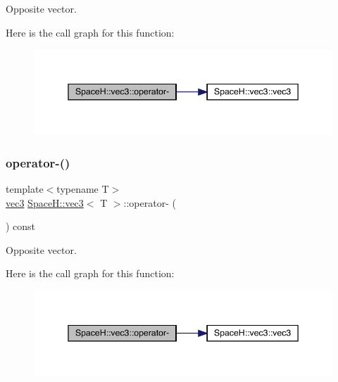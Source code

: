 Opposite vector. 

Here is the call graph for this function\+:
\nopagebreak
\begin{figure}[H]
\begin{center}
\leavevmode
\includegraphics[width=345pt]{struct_space_h_1_1vec3_a74db760e195c089b32b5319e9d45028e_cgraph}
\end{center}
\end{figure}
\mbox{\label{struct_space_h_1_1vec3_a74db760e195c089b32b5319e9d45028e}} 
\subsubsection{\texorpdfstring{operator-\/()}{operator-()}\hspace{0.1cm}{\footnotesize\ttfamily [11/11]}}
{\footnotesize\ttfamily template$<$typename T$>$ \\
\mbox{\hyperlink{struct_space_h_1_1vec3}{vec3}} \mbox{\hyperlink{struct_space_h_1_1vec3}{Space\+H\+::vec3}}$<$ T $>$\+::operator-\/ (\begin{DoxyParamCaption}{ }\end{DoxyParamCaption}) const\hspace{0.3cm}{\ttfamily [inline]}}



Opposite vector. 

Here is the call graph for this function\+:
\nopagebreak
\begin{figure}[H]
\begin{center}
\leavevmode
\includegraphics[width=345pt]{struct_space_h_1_1vec3_a74db760e195c089b32b5319e9d45028e_cgraph}
\end{center}
\end{figure}
\mbox{\label{struct_space_h_1_1vec3_a54124bffc816d8dcf912422647bac6c3}} 

